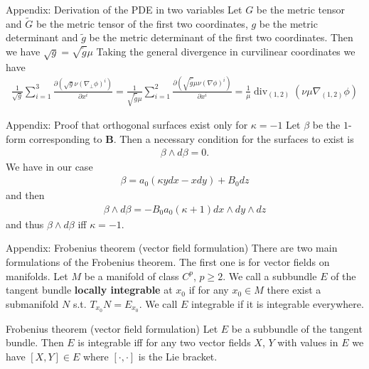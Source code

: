 \documentclass[
	english,%
	logo=false,%
	eurofusion=false, %
	titlegraphic=true, %
	]{ippbeamer}
\DeclareMathOperator{\diver}{div}
\begin{document}
\begin{frame}{Appendix: Derivation of the PDE in two variables}
	Let $G$ be the metric tensor and $\tilde{G}$ be the metric tensor of the first 
	two coordinates, $g$ be the metric determinant and $\tilde{g}$ be the metric determinant
	of the first two coordinates. Then we have $\sqrt{g} = \sqrt{\tilde{g}} \mu$ 
	Taking the general divergence in curvilinear coordinates we have 
	\begin{align*}
		\frac{1}{\sqrt{g}}\sum_{i=1}^3 \frac{\partial (\sqrt{g} \nu (\nabla_\perp \phi)^i)}{\partial x^i}
		= \frac{1}{\sqrt{\tilde{g}} \mu}\sum_{i=1}^{2} 
			\frac{\partial (\sqrt{\tilde{g}} \mu \nu (\nabla \phi)^i)}{\partial x^i}
		= \frac{1}{\mu} \diver_{(1,2)} (\nu \mu \nabla_{(1,2)} \phi)
	\end{align*}
\end{frame}

\begin{frame}{Appendix: Proof that orthogonal surfaces exist only for $\kappa = -1$}
	Let $\beta$ be the $1$-form corresponding to $\mathbf{B}$. Then a necessary condition for 
	the surfaces to exist is 
	\begin{align*}
		\beta \wedge d\beta = 0.
	\end{align*}
	We have in our case
	\begin{align*}
		\beta = a_0 (\kappa y dx - x dy) + B_0 dz
	\end{align*}
	and then
	\begin{align*}
		\beta \wedge d\beta = - B_0 a_0 (\kappa+1) dx \wedge dy \wedge dz 
	\end{align*}
	and thus $\beta \wedge d\beta$ iff $\kappa = -1$.
\end{frame}

\begin{frame}{Appendix: Frobenius theorem (vector field formulation)}
	There are two main formulations of the Frobenius theorem. The first one is
	for vector fields on manifolds. Let $M$ be a manifold of class $C^p$, $p\geq 2$. 
	We call a subbundle $E$ of the tangent bundle \textbf{locally integrable} at $x_0$ if 
	for any $x_0 \in M$ there exist a submanifold $N$ s.t. 
	$T_{x_0}N = E_{x_0}$. We call $E$ integrable if it is integrable everywhere.

	\begin{alertblock}{Frobenius theorem (vector field formulation)}
		Let $E$ be a subbundle 
		of the tangent bundle. 
		Then $E$ is integrable iff
		for any two vector fields $X$, $Y$ with values in $E$ we have 
		$[X,Y] \in E$ where $[\cdot,\cdot]$ is the Lie bracket.
	\end{alertblock}
\end{frame}
\end{document}
